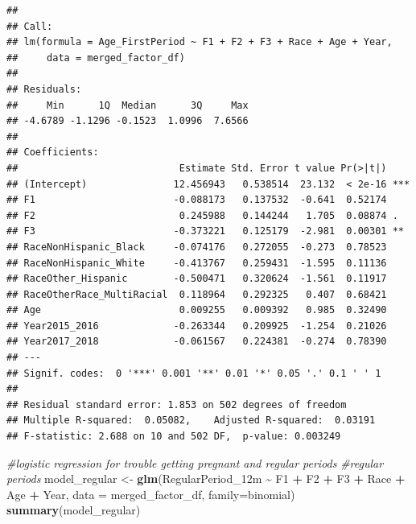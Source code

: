 \documentclass[
]{article}
\newenvironment{Shaded}{\begin{snugshade}}{\end{snugshade}}
\newcommand{\AttributeTok}[1]{\textcolor[rgb]{0.13,0.29,0.53}{#1}}
\newcommand{\CommentTok}[1]{\textcolor[rgb]{0.56,0.35,0.01}{\textit{#1}}}
\newcommand{\FunctionTok}[1]{\textcolor[rgb]{0.13,0.29,0.53}{\textbf{#1}}}
\newcommand{\NormalTok}[1]{#1}
\newcommand{\OtherTok}[1]{\textcolor[rgb]{0.56,0.35,0.01}{#1}}
\newcommand{\SpecialCharTok}[1]{\textcolor[rgb]{0.81,0.36,0.00}{\textbf{#1}}}
\begin{document}
\begin{verbatim}
## 
## Call:
## lm(formula = Age_FirstPeriod ~ F1 + F2 + F3 + Race + Age + Year, 
##     data = merged_factor_df)
## 
## Residuals:
##     Min      1Q  Median      3Q     Max 
## -4.6789 -1.1296 -0.1523  1.0996  7.6566 
## 
## Coefficients:
##                            Estimate Std. Error t value Pr(>|t|)    
## (Intercept)               12.456943   0.538514  23.132  < 2e-16 ***
## F1                        -0.088173   0.137532  -0.641  0.52174    
## F2                         0.245988   0.144244   1.705  0.08874 .  
## F3                        -0.373221   0.125179  -2.981  0.00301 ** 
## RaceNonHispanic_Black     -0.074176   0.272055  -0.273  0.78523    
## RaceNonHispanic_White     -0.413767   0.259431  -1.595  0.11136    
## RaceOther_Hispanic        -0.500471   0.320624  -1.561  0.11917    
## RaceOtherRace_MultiRacial  0.118964   0.292325   0.407  0.68421    
## Age                        0.009255   0.009392   0.985  0.32490    
## Year2015_2016             -0.263344   0.209925  -1.254  0.21026    
## Year2017_2018             -0.061567   0.224381  -0.274  0.78390    
## ---
## Signif. codes:  0 '***' 0.001 '**' 0.01 '*' 0.05 '.' 0.1 ' ' 1
## 
## Residual standard error: 1.853 on 502 degrees of freedom
## Multiple R-squared:  0.05082,    Adjusted R-squared:  0.03191 
## F-statistic: 2.688 on 10 and 502 DF,  p-value: 0.003249
\end{verbatim}

\begin{Shaded}
\begin{Highlighting}[]
\CommentTok{\#logistic regression for trouble getting pregnant and regular periods }
\CommentTok{\#regular periods}
\NormalTok{model\_regular }\OtherTok{\textless{}{-}} \FunctionTok{glm}\NormalTok{(RegularPeriod\_12m }\SpecialCharTok{\textasciitilde{}}\NormalTok{ F1 }\SpecialCharTok{+}\NormalTok{ F2 }\SpecialCharTok{+}\NormalTok{ F3 }\SpecialCharTok{+}\NormalTok{ Race }\SpecialCharTok{+}\NormalTok{ Age }\SpecialCharTok{+}\NormalTok{ Year, }\AttributeTok{data =}\NormalTok{ merged\_factor\_df,}
                     \AttributeTok{family=}\NormalTok{binomial)}
\FunctionTok{summary}\NormalTok{(model\_regular)}
\end{Highlighting}
\end{Shaded}
\end{document}
